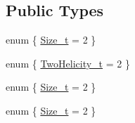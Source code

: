 \subsection*{Public Types}
\begin{DoxyCompactItemize}
\item 
enum \{ \mbox{\hyperlink{structHadron_1_1H1D4E2Rep_a4c0766f2396a1ad1b1abb0979ddddc62a2ee231ac951d55bcd81d8359704ed870}{Size\+\_\+t}} = 2
 \}
\item 
enum \{ \mbox{\hyperlink{structHadron_1_1H1D4E2Rep_afc019a1cb91f31e02ef18f0592d5b71da7dd8dc8e396ffef2ba17711c05bf55c4}{Two\+Helicity\+\_\+t}} = 2
 \}
\item 
enum \{ \mbox{\hyperlink{structHadron_1_1H1D4E2Rep_a4c0766f2396a1ad1b1abb0979ddddc62a2ee231ac951d55bcd81d8359704ed870}{Size\+\_\+t}} = 2
 \}
\item 
enum \{ \mbox{\hyperlink{structHadron_1_1H1D4E2Rep_a4c0766f2396a1ad1b1abb0979ddddc62a2ee231ac951d55bcd81d8359704ed870}{Size\+\_\+t}} = 2
 \}
\end{DoxyCompactItemize}

